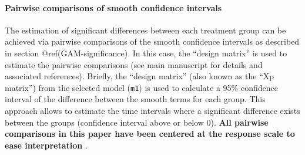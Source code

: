 \documentclass[Royal,times,sagev]{sagej}
\begin{document}
\hypertarget{pairwise-comparisons-of-smooth-confidence-intervals}{%
\paragraph{Pairwise comparisons of smooth confidence
intervals}\label{pairwise-comparisons-of-smooth-confidence-intervals}}

The estimation of significant differences between each treatment group
can be achieved via pairwise comparisons of the smooth confidence
intervals as described in section @ref(GAM-significance). In this case,
the ``design matrix'' is used to estimate the pairwise comparisons (see
main manuscript for details and associated references). Briefly, the
``design matrix'' (also known as the ``Xp matrix'') from the selected
model (\texttt{m1}) is used to calculate a 95\% confidence interval of
the difference between the smooth terms for each group. This approach
allows to estimate the time intervals where a significant difference
exists between the groups (confidence interval above or below 0).
\textbf{All pairwise comparisons in this paper have been centered at the
response scale to ease interpretation }.
\end{document}
